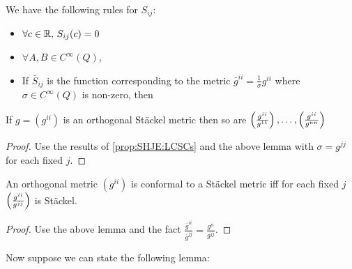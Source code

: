 \documentclass{article}
\begin{document}
\begin{lemma}[Properties of $S_{ij}$]
We have the following rules for $S_{ij}$:
\begin{itemize}
	\item $\forall c \in \mathbb{R}, \, S_{ij}(c) = 0$
	\item $\forall A,B \in C^\infty(Q)$,
\item If $\bar{S}_{ij}$ is the function corresponding to the metric $\bar{g}^{ii} = \frac{1}{\sigma} g^{ii}$ where $\sigma\in  C^\infty(Q)$ is non-zero, then 
\end{itemize}	
\end{lemma}

\begin{lemma}
	If $g = (g^{ii})$ is an orthogonal St\"ackel metric then so are $\left( \frac{g^{ii}}{g^{11}} \right),\dots, \left( \frac{g^{ii}}{g^{nn}} \right)$
\end{lemma}
\begin{proof}
	Use the results of \ref{prop:SHJE:LCSCs} and the above lemma with $\sigma = g^{jj}$ for each fixed $j$. 
\end{proof}

\begin{prop}
	An orthogonal metric $(g^{ii})$ is conformal to a St\"ackel metric iff for each fixed $j$ $\left( \frac{g^{ii}}{g^{jj}} \right)$ is St\"ackel.
\end{prop}
\begin{proof}
	Use the above lemma and the fact $\frac{\bar{g}^{ii}}{\bar{g}^{jj}} = \frac{g^{ii}}{g^{jj}}$.
\end{proof}
Now suppose we can state the following lemma:
\end{document}
